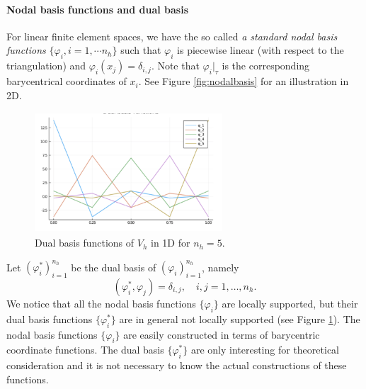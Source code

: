 \paragraph{Nodal basis functions and dual basis}
For linear finite element spaces, we have the so
called \emph{a standard nodal basis functions} $\{\varphi
_i,i=1,\cdots n_h\}$ such that $\varphi_i$ is piecewise linear (with
respect to the triangulation) and $\varphi_i(x_j)=\delta_{i,j}$.  Note
that $\varphi _i|_\tau$ is the corresponding barycentrical coordinates
of $x_i$. See Figure \ref{fig:nodalbasis} for an illustration in 2D.
\begin{figure}[hpt]
\centering
\includegraphics*[height=4.5cm,width=7cm]{6DL/figures/Dualbasis}
\caption{Dual basis functions of $V_h$ in 1D for $n_h=5$.}
\label{fig:dualbasis}
\end{figure}
Let $(\varphi_i^*)_{i=1}^{n_h}$ be the dual basis of $(\varphi_i)_{i=1}^{n_h}$, namely
\begin{equation}
  \label{eq:1}
(\varphi_i^*, \varphi_j) =\delta_{i, j}, \quad i, j=1,\ldots, n_h.    
\end{equation}
We notice that all the nodal basis functions $\{\varphi_i\}$ are locally
supported, but their dual basis functions $\{\varphi_i^*\}$ are in general
not locally supported (see Figure \ref{fig:dualbasis}).  The nodal basis functions $\{\varphi_i\}$ are
easily constructed in terms of barycentric coordinate functions.  The
dual basis $\{\varphi_i^*\}$ are only interesting for theoretical
consideration and it is not necessary to know the actual constructions
of these functions.

